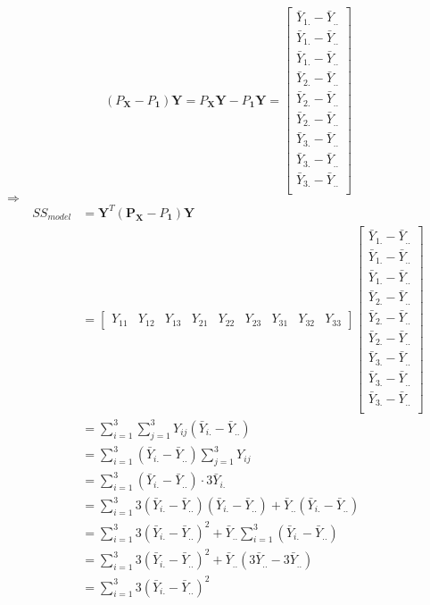\documentclass{article}
\begin{document}
\begin{enumerate}[leftmargin = 0 em, label = \arabic*., font = \bfseries]
	\[( P_{\bm X} - P_{\bm 1})\bm Y =  P_{\bm X}\bm Y - P_{\bm 1}\bm Y = \begin{bmatrix}
		\bar{Y}_{1.} - \bar{Y}_{..}\\
		\bar{Y}_{1.} - \bar{Y}_{..}\\
		\bar{Y}_{1.} - \bar{Y}_{..}\\
		\bar{Y}_{2.} - \bar{Y}_{..}\\
		\bar{Y}_{2.} - \bar{Y}_{..}\\
		\bar{Y}_{2.} - \bar{Y}_{..}\\
		\bar{Y}_{3.} - \bar{Y}_{..}\\
		\bar{Y}_{3.} - \bar{Y}_{..}\\
		\bar{Y}_{3.} - \bar{Y}_{..}\\
	\end{bmatrix}\]
	$\Rightarrow$
	\begin{align*}
	SS_{model} &= \bm Y^T (\bm P_{\bm X} - P_{\bm 1})\bm Y\\
	& = \begin{bmatrix}
		Y_{11} & Y_{12} & Y_{13} & Y_{21} & Y_{22} & Y_{23} & Y_{31} & Y_{32} & Y_{33}
	\end{bmatrix}
	 \begin{bmatrix}
		\bar{Y}_{1.} - \bar{Y}_{..}\\
		\bar{Y}_{1.} - \bar{Y}_{..}\\
		\bar{Y}_{1.} - \bar{Y}_{..}\\
		\bar{Y}_{2.} - \bar{Y}_{..}\\
		\bar{Y}_{2.} - \bar{Y}_{..}\\
		\bar{Y}_{2.} - \bar{Y}_{..}\\
		\bar{Y}_{3.} - \bar{Y}_{..}\\
		\bar{Y}_{3.} - \bar{Y}_{..}\\
		\bar{Y}_{3.} - \bar{Y}_{..}\\
	\end{bmatrix}
	\\
	&= \sum_{i = 1}^3 \sum_{j = 1}^3 Y_{ij}(\bar{Y}_{i.} - \bar{Y}_{..})\\
	& = \sum_{i = 1}^3 (\bar{Y}_{i.} - \bar{Y}_{..}) \sum_{j = 1}^3 Y_{ij}\\
	& = \sum_{i  =1}^3 (\bar{Y}_{i.} - \bar{Y}_{..}) \cdot 3 \bar{Y}_{i.}\\
	& = \sum_{i  =1}^3 3(\bar{Y}_{i.} - \bar{Y}_{..})(\bar{Y}_{i.} - \bar{Y}_{..}) + \bar{Y}_{..}(\bar{Y}_{i.} - \bar{Y}_{..})\\
	& = \sum_{i  =1}^3 3(\bar{Y}_{i.} - \bar{Y}_{..})^2 + \bar{Y}_{..} \sum_{i = 1}^3(\bar{Y}_{i.} - \bar{Y}_{..}) \\
	& = \sum_{i  =1}^3 3(\bar{Y}_{i.} - \bar{Y}_{..})^2 + \bar{Y}_{..}(3 \bar{Y}_{..} - 3 \bar{Y}_{..}) \\
	& = \sum_{i  =1}^3 3(\bar{Y}_{i.} - \bar{Y}_{..})^2
	\end{align*}
	

\end{enumerate}
\end{document}

